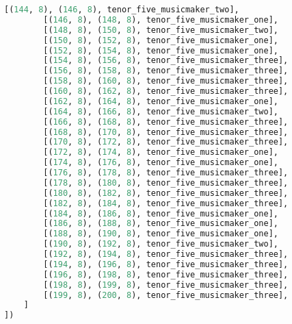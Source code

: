 \begin{lstlisting}[language=Python, caption=Invocation Source Code]
        [(144, 8), (146, 8), tenor_five_musicmaker_two],
        [(146, 8), (148, 8), tenor_five_musicmaker_one],
        [(148, 8), (150, 8), tenor_five_musicmaker_two],
        [(150, 8), (152, 8), tenor_five_musicmaker_one],
        [(152, 8), (154, 8), tenor_five_musicmaker_one],
        [(154, 8), (156, 8), tenor_five_musicmaker_three],
        [(156, 8), (158, 8), tenor_five_musicmaker_three],
        [(158, 8), (160, 8), tenor_five_musicmaker_three],
        [(160, 8), (162, 8), tenor_five_musicmaker_three],
        [(162, 8), (164, 8), tenor_five_musicmaker_one],
        [(164, 8), (166, 8), tenor_five_musicmaker_two],
        [(166, 8), (168, 8), tenor_five_musicmaker_three],
        [(168, 8), (170, 8), tenor_five_musicmaker_three],
        [(170, 8), (172, 8), tenor_five_musicmaker_three],
        [(172, 8), (174, 8), tenor_five_musicmaker_one],
        [(174, 8), (176, 8), tenor_five_musicmaker_one],
        [(176, 8), (178, 8), tenor_five_musicmaker_three],
        [(178, 8), (180, 8), tenor_five_musicmaker_three],
        [(180, 8), (182, 8), tenor_five_musicmaker_three],
        [(182, 8), (184, 8), tenor_five_musicmaker_three],
        [(184, 8), (186, 8), tenor_five_musicmaker_one],
        [(186, 8), (188, 8), tenor_five_musicmaker_one],
        [(188, 8), (190, 8), tenor_five_musicmaker_one],
        [(190, 8), (192, 8), tenor_five_musicmaker_two],
        [(192, 8), (194, 8), tenor_five_musicmaker_three],
        [(194, 8), (196, 8), tenor_five_musicmaker_three],
        [(196, 8), (198, 8), tenor_five_musicmaker_three],
        [(198, 8), (199, 8), tenor_five_musicmaker_three],
        [(199, 8), (200, 8), tenor_five_musicmaker_three],
    ]
])


\end{lstlisting}
